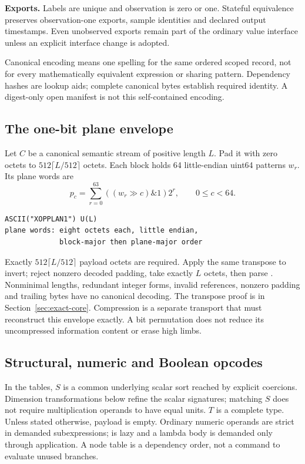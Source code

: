 \textbf{Exports.} Labels are unique and observation is zero or one. Stateful
equivalence preserves observation-one exports, sample identities and declared
output timestamps. Even unobserved exports remain part of the ordinary value
interface unless an explicit interface change is adopted.

Canonical encoding means one spelling for the same ordered scoped record, not
for every mathematically equivalent expression or sharing pattern. Dependency
hashes are lookup aids; complete canonical bytes establish required identity.
A digest-only open manifest is not this self-contained encoding.

\subsection{The one-bit plane envelope}
Let $C$ be a canonical semantic stream of positive length $L$. Pad it with zero
octets to $512\lceil L/512\rceil$ octets. Each block holds 64 little-endian
uint64 patterns $w_r$. Its plane words are
\[
 p_c=\sum_{r=0}^{63}\left((w_r\mathbin{\gg}c)\mathbin{\&}1\right)2^r,
 \qquad 0\le c<64.
\]
\begin{lstlisting}
ASCII("XOPPLAN1") U(L)
plane words: eight octets each, little endian,
             block-major then plane-major order
\end{lstlisting}
Exactly $512\lceil L/512\rceil$ payload octets are required. Apply the same
transpose to invert; reject nonzero decoded padding, take exactly $L$ octets,
then parse . Nonminimal lengths, redundant integer forms, invalid
references, nonzero padding and trailing bytes have no canonical decoding.
The transpose proof is in Section~\ref{sec:exact-core}. Compression is a separate
transport that must reconstruct this envelope exactly. A bit permutation does
not reduce its uncompressed information content or erase high limbs.

\subsection{Structural, numeric and Boolean opcodes}
In the tables, $S$ is a common underlying scalar sort reached by explicit
coercions. Dimension transformations below refine the scalar signatures;
matching $S$ does not require multiplication operands to have equal units.
$T$ is a complete type. Unless stated otherwise, payload is empty. Ordinary
numeric operands are strict in demanded subexpressions;  is lazy and a
lambda body is demanded only through application. A node table is a dependency
order, not a command to evaluate unused branches.

